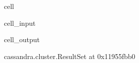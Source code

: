 \documentclass[letterpaper,10pt,english]{jupyterBook}
\begin{document}
\begin{sphinxuseclass}{cell}\begin{sphinxVerbatimInput}

\begin{sphinxuseclass}{cell_input}
\begin{sphinxVerbatim}[commandchars=\\\{\}]
\end{sphinxVerbatim}

\end{sphinxuseclass}\end{sphinxVerbatimInput}
\begin{sphinxVerbatimOutput}

\begin{sphinxuseclass}{cell_output}
\begin{sphinxVerbatim}[commandchars=\\\{\}]
\PYGZlt{}cassandra.cluster.ResultSet at 0x11955fbb0\PYGZgt{}
\end{sphinxVerbatim}

\end{sphinxuseclass}\end{sphinxVerbatimOutput}

\end{sphinxuseclass}
\end{document}
